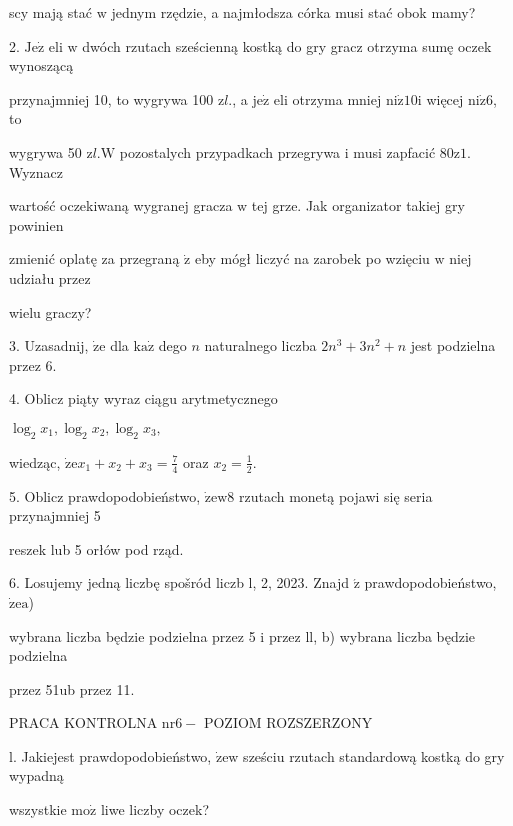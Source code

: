 \documentclass[a4paper,12pt]{article}
\begin{document}
scy mają stać $\mathrm{w}$ jednym rzędzie, a najmłodsza córka musi stać obok mamy?

2. $\mathrm{J}\mathrm{e}\dot{\mathrm{z}}$ eli $\mathrm{w}$ dwóch rzutach sześcienną kostką do gry gracz otrzyma sumę oczek wynoszącą

przynajmniej 10, to wygrywa 100 $\mathrm{z}l.$, a $\mathrm{j}\mathrm{e}\dot{\mathrm{z}}$ eli otrzyma mniej $\mathrm{n}\mathrm{i}\dot{\mathrm{z}} 10\mathrm{i}$ więcej $\mathrm{n}\mathrm{i}\dot{\mathrm{z}}6$, to

wygrywa 50 $\mathrm{z}l. \mathrm{W}$ pozostalych przypadkach przegrywa $\mathrm{i}$ musi zapfacić $80\mathrm{z}1$. Wyznacz

wartość oczekiwaną wygranej gracza $\mathrm{w}$ tej grze. Jak organizator takiej gry powinien

zmienić oplatę za przegraną $\dot{\mathrm{z}}$ eby mógł liczyć na zarobek po wzięciu $\mathrm{w}$ niej udziału przez

wielu graczy?

3. Uzasadnij, $\dot{\mathrm{z}}\mathrm{e}$ dla $\mathrm{k}\mathrm{a}\dot{\mathrm{z}}$ dego $n$ naturalnego liczba $2n^{3}+3n^{2}+n$ jest podzielna przez 6.

4. Oblicz piąty wyraz ciągu arytmetycznego

$\log_{2}x_{1},\log_{2}x_{2},\log_{2}x_{3},$

wiedząc, $\displaystyle \dot{\mathrm{z}}\mathrm{e}x_{1}+x_{2}+x_{3}=\frac{7}{4}$ oraz $x_{2}=\displaystyle \frac{1}{2}.$

5. Oblicz prawdopodobieństwo, $\dot{\mathrm{z}}\mathrm{e}\mathrm{w} 8$ rzutach monetą pojawi się seria przynajmniej 5

reszek lub 5 orłów pod rząd.

6. Losujemy jedną liczbę spošród liczb l, 2, 2023. Znajd $\acute{\mathrm{z}}$ prawdopodobieństwo, $\dot{\mathrm{z}}\mathrm{e} \mathrm{a}$)

wybrana liczba będzie podzielna przez 5 $\mathrm{i}$ przez ll, b) wybrana liczba będzie podzielna

przez 51ub przez 11.




PRACA KONTROLNA $\mathrm{n}\mathrm{r} 6-$ POZIOM ROZSZERZONY

l. Jakiejest prawdopodobieństwo, $\dot{\mathrm{z}}\mathrm{e}\mathrm{w}$ sześciu rzutach standardową kostką do gry wypadną

wszystkie $\mathrm{m}\mathrm{o}\dot{\mathrm{z}}$ liwe liczby oczek?
\end{document}
